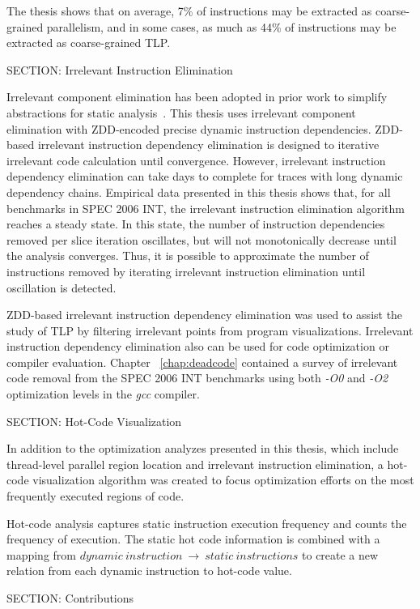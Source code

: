 {The thesis shows that on average, 7\% of instructions may be extracted as coarse-grained parallelism, and in some cases, as much as 44\% of instructions may be extracted as coarse-grained TLP.

SECTION: Irrelevant Instruction Elimination


Irrelevant component elimination has been adopted in prior work to simplify abstractions for static analysis~\cite{corbett:icsc:2000}. This thesis uses irrelevant component elimination with ZDD-encoded precise dynamic instruction dependencies.  ZDD-based irrelevant instruction dependency elimination is designed to iterative irrelevant code calculation until convergence.  However, irrelevant instruction dependency elimination can take days to complete for traces with long dynamic dependency chains. Empirical data presented in this thesis shows that, for all benchmarks in SPEC 2006 INT, the irrelevant instruction elimination algorithm reaches a steady state.  In this state, the number of instruction dependencies removed per slice iteration oscillates, but will not monotonically decrease until the analysis converges.  Thus, it is possible to approximate the number of instructions removed by iterating irrelevant instruction elimination until oscillation is detected.

ZDD-based irrelevant instruction dependency elimination was used to assist the study of TLP by filtering irrelevant points from program visualizations.  Irrelevant instruction dependency elimination also can be used for code optimization or compiler evaluation.  Chapter ~\ref{chap:deadcode} contained a survey of irrelevant code removal from the SPEC 2006 INT benchmarks using both \textit{-O0} and \textit{-O2} optimization levels in the \textit{gcc} compiler.

SECTION: Hot-Code Visualization


In addition to the optimization analyzes presented in this thesis, which include thread-level parallel region location and irrelevant instruction elimination, a hot-code visualization algorithm was created to focus optimization efforts on the most frequently executed regions of code.

Hot-code analysis captures static instruction execution frequency and counts the frequency of execution.  The static hot code information is combined with a mapping from $dynamic\ instruction \ \rightarrow \ static\ instructions$ to create a new relation from each dynamic instruction to hot-code value.

SECTION: Contributions


}

